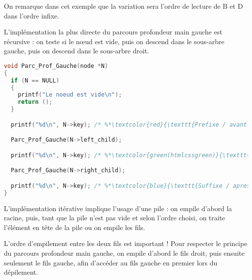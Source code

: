 \documentclass[11pt,a4paper]{article}
\begin{document}
On remarque dans cet exemple que la variation sera l'ordre de lecture de B et D dans l'ordre infixe.

\bigskip

L'implémentation la plus directe du parcours profondeur main gauche est récursive : on teste si le nœud est vide, puis on descend dans le sous-arbre gauche, puis on descend dans le sous-arbre droit.

\medskip

%
%

\begin{lstlisting}[language=C]
void Parc_Prof_Gauche(node *N)
{
  if (N == NULL)
  {
    printf("Le noeud est vide\n");
    return ();
  }

  printf("%d\n", N->key); /* %*\textcolor{red}{\texttt{Prefixe / avant fils gauche}}*) */

  Parc_Prof_Gauche(N->left_child);

  printf("%d\n", N->key); /* %*\textcolor{green(htmlcssgreen)}{\texttt{Infixe / ap. fils gauche \& av. fils droit}}*) */

  Parc_Prof_Gauche(N->right_child);

  printf("%d\n", N->key); /* %*\textcolor{blue}{\texttt{Suffixe / apres fils droit}}*) */
} \end{lstlisting}


\vspace{-0.5cm}

L'implémentation itérative implique l'usage d'une pile : on empile d'abord la racine, puis, tant que la pile n'est pas vide et selon l'ordre choisi, on traite l'élément en tête de la pile ou on empile les fils.

L'ordre d'empilement entre les deux fils est important !
Pour respecter le principe du parcours profondeur main gauche, on empile d'abord le fils droit, puis ensuite seulement le fils gauche, afin d'accéder au fils gauche en premier lors du dépilement.

\bigskip
\end{document}

